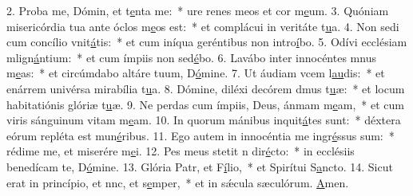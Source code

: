 2. Proba me, Dómin, et t\uline{e}nta me:~* ure renes meos et cor m\uline{e}um.
3. Quóniam misericórdia tua ante óclos m\uline{e}os est:~* et complácui in veritáte t\uline{u}a.
4. Non sedi cum concílio vnit\uline{á}tis:~* et cum iníqua geréntibus non intro\uline{í}bo.
5. Odívi ecclésiam mlign\uline{á}ntium:~* et cum ímpiis non sed\uline{é}bo.
6. Lavábo inter innocéntes mnus m\uline{e}as:~* et circúmdabo altáre tuum, D\uline{ó}mine.
7. Ut áudiam vcem l\uline{au}dis:~* et enárrem univérsa mirabília t\uline{u}a.
8. Dómine, diléxi decórem dmus t\uline{u}æ:~* et locum habitatiónis glóriæ t\uline{u}æ.
9. Ne perdas cum ímpiis, Deus, ánmam m\uline{e}am,~* et cum viris sánguinum vitam m\uline{e}am.
10. In quorum mánibus inquit\uline{á}tes sunt:~* déxtera eórum repléta est mun\uline{é}ribus.
11. Ego autem in innocéntia me ingr\uline{é}ssus sum:~* rédime me, et miserére m\uline{e}i.
12. Pes meus stetit n dir\uline{é}cto:~* in ecclésiis benedícam te, D\uline{ó}mine.
13. Glória Patr, et F\uline{í}lio,~* et Spirítui S\uline{a}ncto.
14. Sicut erat in princípio, et nnc, et s\uline{e}mper,~* et in sǽcula sæculórum. \uline{A}men.

